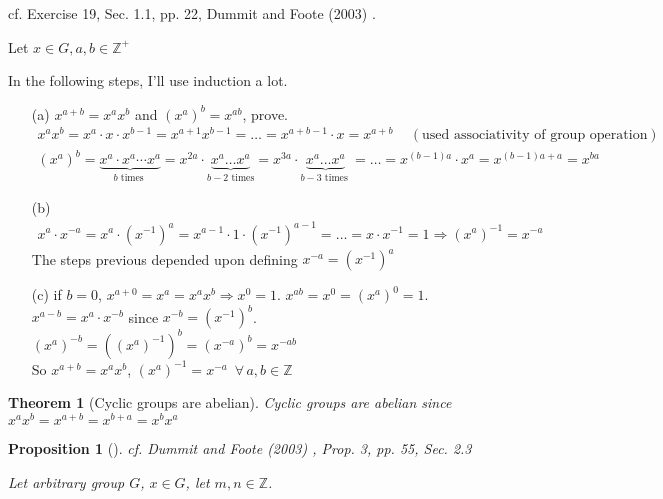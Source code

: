 \documentclass[10pt]{amsart}
\newtheorem{theorem}{Theorem}
\newtheorem{proposition}{Proposition}
\newcommand{\exercisehead}[1]
  { \smallskip
   \noindent{\small\bf Exercise #1.}
  }
\begin{document}
\begin{multicols*}{2}
\exercisehead{19} cf. Exercise 19, Sec. 1.1, pp. 22, Dummit and Foote (2003) \cite{DuFo2003}.

Let $x \in G, a, b\in \mathbb{Z}^+$

In the following steps, I'll use induction a lot.
\begin{enumerate}
	\item[(a)] $x^{a+b} = x^a x^b $ and $(x^a)^b = x^{ab}$, prove.
	\[
	\begin{gathered}
		x^ax^b = x^a \cdot x \cdot x^{b-1} = x^{a+1} x^{b-1} = \dots = x^{a+b - 1} \cdot x = x^{a+b} \quad \, (\text{used associativity of group operation}) \\
		(x^a)^b = \underbrace{x^a \cdot x^a \cdots x^a }_{b \text{ times } } = x^{2a} \cdot \underbrace{x^a \dots x^a}_{ b- 2 \text{ times} } = x^{3a} \cdot \underbrace{x^a \dots x^a }_{b-3 \text{ times } } = \dots = x^{(b-1) a} \cdot x^a = x^{ (b-1) a + a} = x^{ba}
	\end{gathered}
	\]
	\item[(b)] 
	\[
	\begin{gathered}
		x^a \cdot x^{-a} = x^a \cdot (x^{-1})^a = x^{a-1} \cdot 1 \cdot (x^{-1})^{a-1} = \dots = x\cdot x^{-1} = 1 \Longrightarrow (x^a)^{-1} = x^{-a}
	\end{gathered}
	\]
	The steps previous depended upon defining $x^{-a} = (x^{-1})^a$
	\item[(c)] if $b=0$, $x^{a+0} = x^a = x^a x^b \Longrightarrow x^0 = 1$. $x^{ab} = x^0 = (x^a)^0 = 1$. \\
	
	$x^{a-b} = x^a \cdot x^{-b}$ since $x^{-b} = (x^{-1})^b$. \\
	
	$(x^a)^{-b} = ((x^a)^{-1})^b = (x^{-a})^b = x^{-ab}$ \\
	
	So $x^{a+b} = x^a x^b$, $(x^a)^{-1} = x^{-a}$ $\, \forall \, a,b \in \mathbb{Z}$
\end{enumerate}

\begin{theorem}[Cyclic groups are abelian]\label{Thm:CyclicGroupsAreAbelian}
	Cyclic groups are abelian since $x^a x^b = x^{a+b} = x^{b+a} = x^b x^a$
\end{theorem}

\begin{proposition}[]\label{Prop:OrderDividesExponentOfCyclicGroupGeneratorRelation}
cf. Dummit and Foote (2003) \cite{DuFo2003}, Prop. 3, pp. 55, Sec. 2.3

	Let arbitrary group $G$, $x\in G$, let $m, n \in \mathbb{Z}$. \\


\end{proposition}
\end{multicols*}
\end{document}
